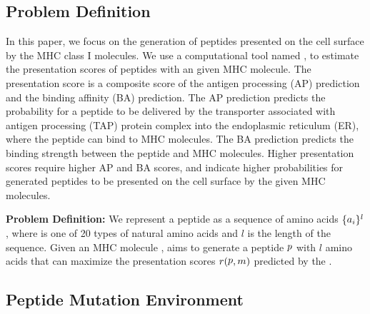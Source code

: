 \documentclass[letterpaper]{article}
\begin{document}
\subsection{Problem Definition}
\label{sec:method:problem}
%
In this paper, we focus on the generation of peptides presented on the cell surface by the MHC class I molecules.
%
We use a computational tool named \mhcflurrynd \cite{odonnell2020}, to estimate the presentation scores of peptides with an given
MHC molecule.
%
The presentation score is a composite score of the antigen processing (AP) prediction 
and the binding affinity (BA) prediction.
%
The AP prediction predicts the probability for a peptide to be delivered by the transporter associated with antigen processing (TAP) protein complex 
into the endoplasmic reticulum (ER), where the peptide can bind to MHC molecules.
%
The BA prediction predicts the binding strength between the peptide and MHC molecules.
%
Higher presentation scores require higher AP and BA scores, and indicate higher probabilities for generated peptides to be presented on the 
cell surface by the given MHC molecules.

\textbf{Problem Definition:} 
%
We represent a peptide as a sequence of amino acids $\{\mbox{$\mathop{a}$}_i\}^l$, where \amino is one of 20 types of natural amino acids and 
$l$ is the length of the sequence.
%
Given an MHC molecule \allele, \pepppo aims to generate a peptide $\mbox{$\mathop{p}$}$ with $l$ amino acids that can maximize the presentation scores $r(\mbox{$\mathop{p}$}, \mbox{$\mathop{m}$})$
predicted by the \mhcflurrynd.
% 
%
%

\subsection{Peptide Mutation Environment}
\label{sec:method:environment}
\end{document}
